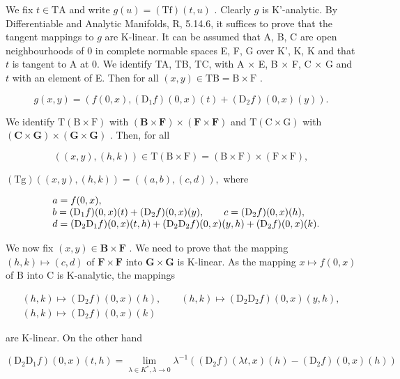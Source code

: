 We fix \(t \in \mathrm{TA}\) and write \(g(u) = (\mathrm{Tf})(t,u)\) . Clearly \(g\) is K'-analytic. By Differentiable and Analytic Manifolds, R, 5.14.6, it suffices to prove that the tangent mappings to \(g\) are K-linear. It can be assumed that A, B, C are open neighbourhoods of 0 in complete normable spaces E, F, G over K', K, K and that \(t\) is tangent to A at 0. We identify TA, TB, TC, with A × E, B × F, C × G and \(t\) with an element of E. Then for all \((x,y) \in \mathrm{TB} = \mathrm{B} \times \mathrm{F}\) .

\[
g (x, y) = \left(f (0, x), \left(\mathrm{D} _ {1} f\right) (0, x) (t) + \left(\mathrm{D} _ {2} f\right) (0, x) (y)\right).
\]

We identify \(\mathrm{T(B\times F)}\) with \((\mathbf{B}\times \mathbf{F})\times (\mathbf{F}\times \mathbf{F})\) and \(\mathrm{T(C\times G)}\) with \((\mathbf{C}\times \mathbf{G})\times (\mathbf{G}\times \mathbf{G})\) . Then, for all

\[
((x, y), (h, k)) \in \mathrm{T} (\mathrm{B} \times \mathrm{F}) = (\mathrm{B} \times \mathrm{F}) \times (\mathrm{F} \times \mathrm{F}),
\]

\((\mathrm{Tg})((x,y),(h,k)) = ((a,b),(c,d)),\) where

\[
\begin{array}{r l} & {a = f (0, x),} \\ & {b = (\mathrm{D} _ {1} f) (0, x) (t) + (\mathrm{D} _ {2} f) (0, x) (y), \qquad c = (\mathrm{D} _ {2} f) (0, x) (h),} \\ & {d = (\mathrm{D} _ {2} \mathrm{D} _ {1} f) (0, x) (t, h) + (\mathrm{D} _ {2} \mathrm{D} _ {2} f) (0, x) (y, h) + (\mathrm{D} _ {2} f) (0, x) (k).} \end{array}
\]

We now fix \((x,y)\in \mathbf{B}\times \mathbf{F}\) . We need to prove that the mapping \((h,k)\mapsto (c,d)\) of \(\mathbf{F}\times \mathbf{F}\) into \(\mathbf{G}\times \mathbf{G}\) is K-linear. As the mapping \(x\mapsto f(0,x)\) of B into C is K-analytic, the mappings

\[
\begin{array}{c} (h, k) \mapsto (\mathrm{D} _ {2} f) (0, x) (h), \qquad (h, k) \mapsto (\mathrm{D} _ {2} \mathrm{D} _ {2} f) (0, x) (y, h), \\ (h, k) \mapsto (\mathrm{D} _ {2} f) (0, x) (k) \end{array}
\]

are K-linear. On the other hand

\[
\left(\mathrm{D} _ {2} \mathrm{D} _ {1} f\right) (0, x) (t, h) = \lim _ {\lambda \in K ^ {*}, \lambda \rightarrow 0} \lambda^ {- 1} \left(\left(\mathrm{D} _ {2} f\right) (\lambda t, x) (h) - \left(\mathrm{D} _ {2} f\right) (0, x) (h)\right)
\]

